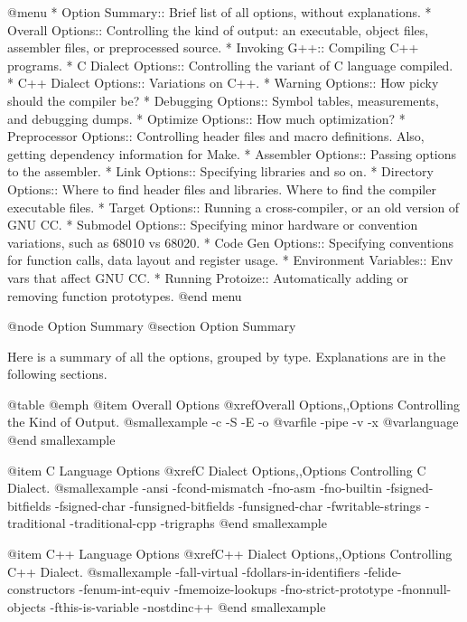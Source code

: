 @menu
* Option Summary::	Brief list of all options, without explanations.
* Overall Options::     Controlling the kind of output:
                        an executable, object files, assembler files,
                        or preprocessed source.
* Invoking G++::	Compiling C++ programs.
* C Dialect Options::   Controlling the variant of C language compiled.
* C++ Dialect Options:: Variations on C++.
* Warning Options::     How picky should the compiler be?
* Debugging Options::   Symbol tables, measurements, and debugging dumps.
* Optimize Options::    How much optimization?
* Preprocessor Options:: Controlling header files and macro definitions.
                         Also, getting dependency information for Make.
* Assembler Options::   Passing options to the assembler.
* Link Options::        Specifying libraries and so on.
* Directory Options::   Where to find header files and libraries.
                        Where to find the compiler executable files.
* Target Options::      Running a cross-compiler, or an old version of GNU CC.
* Submodel Options::    Specifying minor hardware or convention variations,
                        such as 68010 vs 68020.
* Code Gen Options::    Specifying conventions for function calls, data layout
                        and register usage.
* Environment Variables:: Env vars that affect GNU CC.
* Running Protoize::    Automatically adding or removing function prototypes.
@end menu

@node Option Summary
@section Option Summary

Here is a summary of all the options, grouped by type.  Explanations are
in the following sections.

@table @emph
@item Overall Options
@xref{Overall Options,,Options Controlling the Kind of Output}.
@smallexample
-c  -S  -E  -o @var{file}  -pipe  -v  -x @var{language} 
@end smallexample

@item C Language Options
@xref{C Dialect Options,,Options Controlling C Dialect}.
@smallexample
-ansi  -fcond-mismatch  -fno-asm  -fno-builtin
-fsigned-bitfields  -fsigned-char 
-funsigned-bitfields  -funsigned-char  -fwritable-strings
-traditional  -traditional-cpp  -trigraphs
@end smallexample

@item C++ Language Options
@xref{C++ Dialect Options,,Options Controlling C++ Dialect}.
@smallexample
-fall-virtual  -fdollars-in-identifiers
-felide-constructors  -fenum-int-equiv  -fmemoize-lookups
-fno-strict-prototype  -fnonnull-objects
-fthis-is-variable  -nostdinc++
@end smallexample

